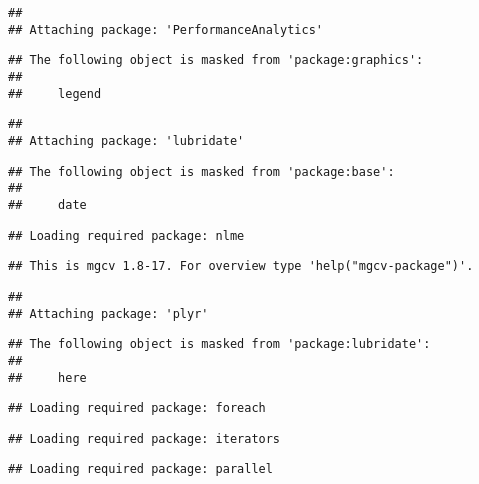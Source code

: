 \documentclass[]{ctexart}
\begin{document}
\begin{verbatim}
## 
## Attaching package: 'PerformanceAnalytics'
\end{verbatim}

\begin{verbatim}
## The following object is masked from 'package:graphics':
## 
##     legend
\end{verbatim}

\begin{verbatim}
## 
## Attaching package: 'lubridate'
\end{verbatim}

\begin{verbatim}
## The following object is masked from 'package:base':
## 
##     date
\end{verbatim}

\begin{verbatim}
## Loading required package: nlme
\end{verbatim}

\begin{verbatim}
## This is mgcv 1.8-17. For overview type 'help("mgcv-package")'.
\end{verbatim}

\begin{verbatim}
## 
## Attaching package: 'plyr'
\end{verbatim}

\begin{verbatim}
## The following object is masked from 'package:lubridate':
## 
##     here
\end{verbatim}

\begin{verbatim}
## Loading required package: foreach
\end{verbatim}

\begin{verbatim}
## Loading required package: iterators
\end{verbatim}

\begin{verbatim}
## Loading required package: parallel
\end{verbatim}
\end{document}

